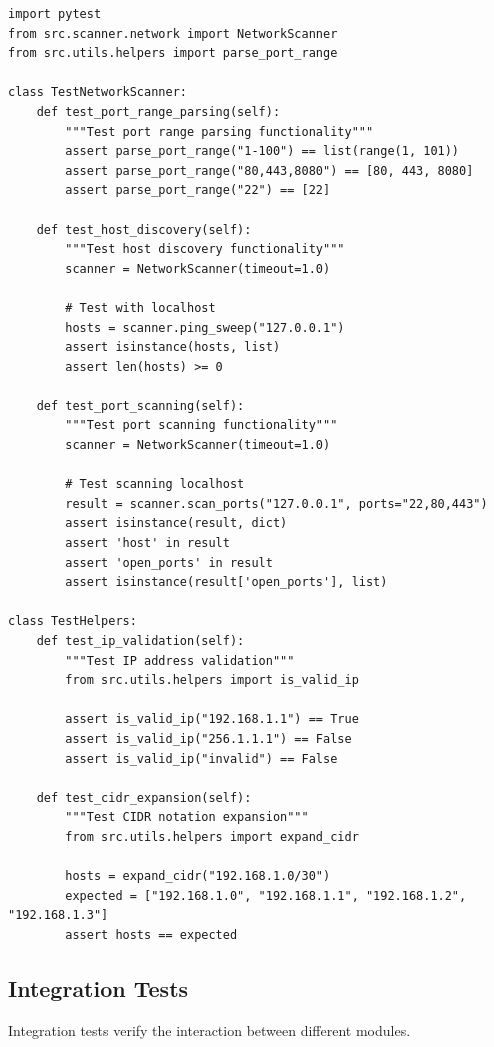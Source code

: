 \documentclass[12pt,a4paper]{report}
\begin{document}
\begin{lstlisting}[caption=Unit Test Example]
import pytest
from src.scanner.network import NetworkScanner
from src.utils.helpers import parse_port_range

class TestNetworkScanner:
    def test_port_range_parsing(self):
        """Test port range parsing functionality"""
        assert parse_port_range("1-100") == list(range(1, 101))
        assert parse_port_range("80,443,8080") == [80, 443, 8080]
        assert parse_port_range("22") == [22]
    
    def test_host_discovery(self):
        """Test host discovery functionality"""
        scanner = NetworkScanner(timeout=1.0)
        
        # Test with localhost
        hosts = scanner.ping_sweep("127.0.0.1")
        assert isinstance(hosts, list)
        assert len(hosts) >= 0
    
    def test_port_scanning(self):
        """Test port scanning functionality"""
        scanner = NetworkScanner(timeout=1.0)
        
        # Test scanning localhost
        result = scanner.scan_ports("127.0.0.1", ports="22,80,443")
        assert isinstance(result, dict)
        assert 'host' in result
        assert 'open_ports' in result
        assert isinstance(result['open_ports'], list)

class TestHelpers:
    def test_ip_validation(self):
        """Test IP address validation"""
        from src.utils.helpers import is_valid_ip
        
        assert is_valid_ip("192.168.1.1") == True
        assert is_valid_ip("256.1.1.1") == False
        assert is_valid_ip("invalid") == False
    
    def test_cidr_expansion(self):
        """Test CIDR notation expansion"""
        from src.utils.helpers import expand_cidr
        
        hosts = expand_cidr("192.168.1.0/30")
        expected = ["192.168.1.0", "192.168.1.1", "192.168.1.2", "192.168.1.3"]
        assert hosts == expected
\end{lstlisting}

\subsection{Integration Tests}

Integration tests verify the interaction between different modules.
\end{document}
